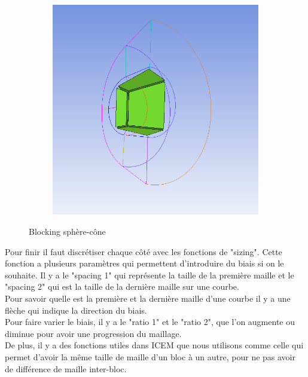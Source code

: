 \begin{figure}[H]
\begin{center}
\begin{subfigure}{0.5\textwidth}
\includegraphics[width=\textwidth]{chapter1_introduction/pictures/icem/castest_fluid_solid/blk2.PNG}
\label{fig:subim2}
\end{subfigure}
\caption{Blocking sphère-cône}
\label{fig:image2}
\end{center}
\end{figure}

Pour finir il faut discrétiser chaque côté avec les fonctions de "sizing". Cette fonction a plusieurs paramètres qui permettent d’introduire du biais si on le souhaite. Il y a le "spacing 1" qui représente la taille de la première maille et le "spacing 2" qui est la taille de la dernière maille sur une courbe.\\
Pour savoir quelle est la première et la dernière maille d’une courbe il y a une flèche qui indique la direction du biais.\\

Pour faire varier le biais, il y a le "ratio 1" et le "ratio 2", que l’on augmente ou diminue pour avoir une progression du maillage.\\
De plus, il y a des fonctions utiles dans ICEM que nous utilisons comme celle qui permet d’avoir la même taille de maille d’un bloc à un autre, pour ne pas avoir de différence de maille inter-bloc.

